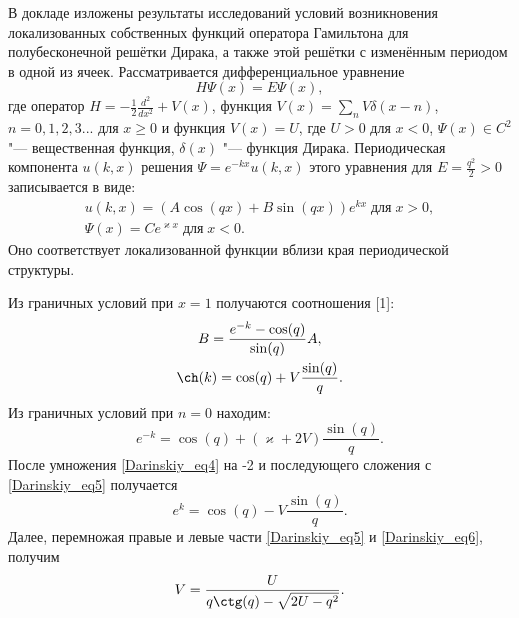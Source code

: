 \vzmscaption

В докладе изложены результаты исследований условий возникновения локализованных собственных функций оператора Гамильтона
для полубесконечной решётки Дирака, а также этой решётки с изменённым периодом в одной из ячеек. Рассматривается дифференциальное уравнение
\begin{equation} \label{Darinskiy_eq1}
 H\Psi(x)=E\Psi(x),
\end{equation}
где оператор $H=-\frac{1}{2}\frac{d^2}{dx^2}+V(x)$, функция $V(x)=\sum\limits_nV\delta(x-n)$, $n=0,1,2,3...$ для $x\geq0$ и
функция $V(x)=U$, где $U>0$ для $x<0$, $\Psi(x)\in C^2$ "--- вещественная функция,
$\delta(x)$ "--- функция Дирака. Периодическая компонента $u(k,x)$ решения $\Psi=e^{-kx}u(k,x)$ этого уравнения для $E=\frac{q^2}{2}>0$ записывается в виде:
\begin{equation} \label{Darinskiy_eq2}
\begin{array}{c}
u(k,x)=(A\cos(qx)+B\sin(qx))e^{kx}\;\text{для}\;x>0,\\
\Psi(x)=Ce^{\varkappa x}\;\text{для}\;x<0.
\end{array}
\end{equation}
Оно соответствует локализованной функции вблизи края периодической структуры.
\par Из граничных условий при $x=1$ получаются соотношения [1]:
\begin{gather}
B=\frac{e^{-k}-\cos(q)}{\sin(q)}A,\\
\ch(k)=\cos(q)+V\frac{\sin(q)}{q}. \label{Darinskiy_eq4}
\end{gather}
Из граничных условий при $n=0$ находим:
\begin{equation}\label{Darinskiy_eq5}
e^{-k}=\cos(q)+\left(\varkappa+2V\right)\frac{\sin(q)}{q}.
\end{equation}
После умножения \eqref{Darinskiy_eq4} на -2 и последующего сложения с \eqref{Darinskiy_eq5} получается
\begin{equation} \label{Darinskiy_eq6}
 e^{k}=\cos(q)-V\frac{\sin(q)}{q}.
\end{equation}
Далее, перемножая правые и левые части \eqref{Darinskiy_eq5} и \eqref{Darinskiy_eq6}, получим
\begin{equation} \label{Darinskiy_eq7}
V=\frac{U}{q\ctg(q)-\sqrt{2U-q^2}}.
\end{equation}
